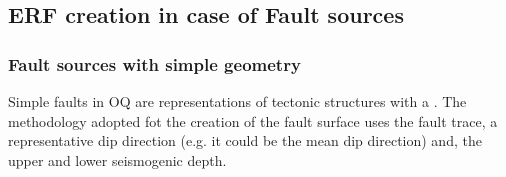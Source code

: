 
\clearpage
\subsection{ERF creation in case of Fault sources}

%
\subsubsection{Fault sources with simple geometry}
Simple faults in OQ are representations of tectonic structures with a . 
The methodology adopted fot the creation of the fault surface uses the 
fault trace, a representative dip direction (e.g. it could be the mean 
dip direction) and, the upper and lower seismogenic depth. 

